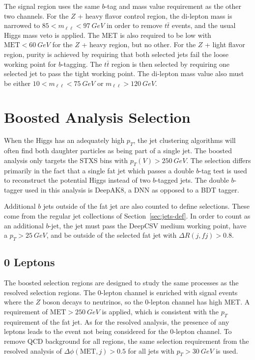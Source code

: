 The signal region uses the same $b$-tag and mass value requirement as the other two channels.
For the $Z$ + heavy flavor control region,
the di-lepton mass is narrowed to $85 < m_{\ell\ell} < \SI{97}{GeV}$
in order to remove $t\bar{t}$ events, and the usual Higgs mass veto is applied.
The MET is also required to be low with $\mathrm{MET} < \SI{60}{GeV}$
for the $Z$ + heavy region, but no other.
For the $Z$ + light flavor region, purity is achieved by requiring
that both selected jets fail the loose working point for $b$-tagging.
The $t\bar{t}$ region is then selected by requiring
one selected jet to pass the tight working point.
The di-lepton mass value also must be either $10 < m_{\ell\ell} < \SI{75}{GeV}$
or $m_{\ell\ell} > \SI{120}{GeV}$.

\section{Boosted Analysis Selection}

When the Higgs has an adequately high $p_T$,
the jet clustering algorithms will often find both daughter particles
as being part of a single jet.
The boosted analysis only targets the STXS bins with $p_T(V) > \SI{250}{GeV}$.
The selection differs primarily in the fact that a single fat jet
which passes a double $b$-tag test \cite{Sirunyan_2018}
is used to reconstruct the potential Higgs instead of two $b$-tagged jets.
The double $b$-tagger used in this analysis is DeepAK8,
a DNN as opposed to a BDT tagger.

Additional $b$ jets outside of the fat jet are also counted to define selections.
These come from the regular jet collections of Section~\ref{sec:jets-def}.
In order to count as an additional $b$-jet,
the jet must pass the DeepCSV medium working point,
have a $p_T > \SI{25}{GeV}$, and be outside of the selected fat jet
with $\Delta R(j, f\!j) > 0.8$.

\subsection{0 Leptons}

The boosted selection regions are designed to study the same processes
as the resolved selection regions.
The 0-lepton channel is enriched with signal events where
the $Z$ boson decays to neutrinos, so the 0-lepton channel has high MET.
A requirement of $\mathrm{MET} > \SI{250}{GeV}$ is applied,
which is consistent with the $p_T$ requirement of the fat jet.
As for the resolved analysis, the presence of any leptons leads to
the event not being considered for the 0-lepton channel.
To remove QCD background for all regions, the same selection requirement from the resolved analysis of
$\Delta \phi(\mathrm{MET}, j) > 0.5$ for all jets with $p_T > \SI{30}{GeV}$ is used.

